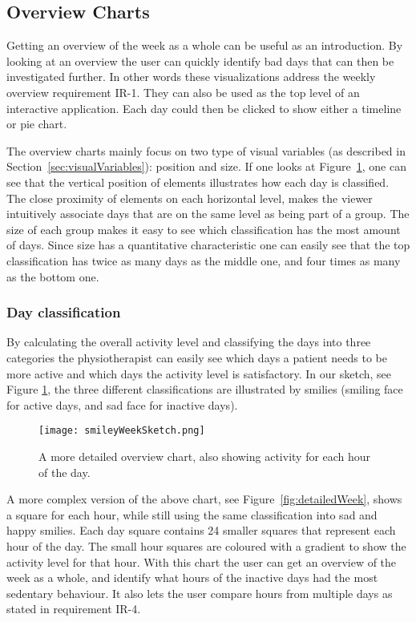 \subsection{Overview Charts}
Getting an overview of the week as a whole can be useful as an introduction. By looking at an overview the user can quickly identify bad days that can then be investigated further. In other words these visualizations address the weekly overview requirement IR-1. They can also be used as the top level of an interactive application. Each day could then be clicked to show either a timeline or pie chart.

The overview charts mainly focus on two type of visual variables (as described in Section~\ref{sec:visualVariables}): position and size. If one looks at Figure~\ref{fig:smileyWeek}, one can see that the vertical position of elements illustrates how each day is classified. The close proximity of elements on each horizontal level, makes the viewer intuitively associate days that are on the same level as being part of a group. The size of each group makes it easy to see which classification has the most amount of days. Since size has a quantitative characteristic one can easily see that the top classification has twice as many days as the middle one, and four times as many as the bottom one.

\subsubsection{Day classification}
By calculating the overall activity level and classifying the days into three categories the physiotherapist can easily see which days a patient needs to be more active and which days the activity level is satisfactory. In our sketch, see Figure \ref{fig:smileyWeek}, the three different classifications are illustrated by smilies (smiling face for active days, and sad face for inactive days).

\begin{figure}[h!]
	\centering
		\texttt{[image: smileyWeekSketch.png]}
		\caption[U1 sketch]{A more detailed overview chart, also showing activity for each hour of the day.}
		\label{fig:smileyWeek}
\end{figure}

A more complex version of the above chart, see Figure~\ref{fig:detailedWeek}, shows a square for each hour, while still using the same classification into sad and happy smilies. Each day square contains 24 smaller squares that represent each hour of the day. The small hour squares are coloured with a gradient to show the activity level for that hour. With this chart the user can get an overview of the week as a whole, and identify what hours of the inactive days had the most sedentary behaviour. It also lets the user compare hours from multiple days as stated in requirement IR-4.

